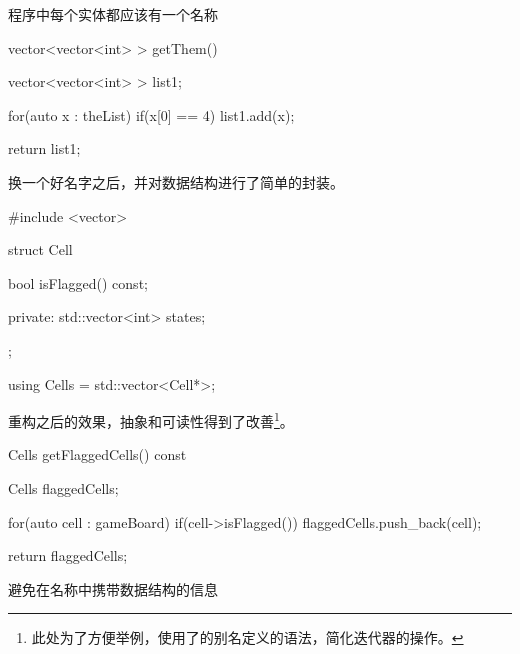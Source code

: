 \begin{content}
\begin{regulation}
程序中每个实体都应该有一个名称
\end{regulation}

\begin{leftbar}
\begin{c++}
vector<vector<int> > getThem() 
{
    vector<vector<int> > list1;
    
    for(auto x : theList)
    {
        if(x[0] == 4)
        {   
            list1.add(x);
        }
    }
    
    return list1;
}
\end{c++}
\end{leftbar}

\begin{enum}
\end{enum}

换一个好名字之后，并对数据结构进行了简单的封装。

\begin{leftbar}
\begin{c++}
#include <vector>

struct Cell
{
    bool isFlagged() const;

private:
    std::vector<int> states;
};

using Cells = std::vector<Cell*>;

\end{c++}
\end{leftbar}

重构之后的效果，抽象和可读性得到了改善\footnote{此处为了方便举例，使用了\cpp{}的别名定义的语法，简化迭代器的操作。}。

\begin{leftbar}
\begin{c++}
Cells getFlaggedCells() const
{
    Cells flaggedCells;

    for(auto cell : gameBoard)
    { 
        if(cell->isFlagged())
        {
            flaggedCells.push_back(cell);
        }
    }

    return flaggedCells;
}
\end{c++}
\end{leftbar}

\begin{regulation}
避免在名称中携带数据结构的信息
\end{regulation}


\end{content}
